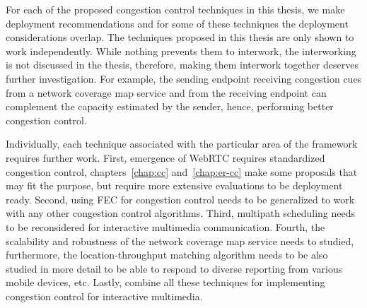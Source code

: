 




For each of the proposed congestion control techniques in this thesis, we make
deployment recommendations and for some of these techniques the deployment
considerations overlap. The techniques proposed in this thesis are only shown
to work independently. While nothing prevents them to interwork, the
interworking is not discussed in the thesis, therefore, making them interwork
together deserves further investigation. For example, the sending endpoint
receiving congestion cues from a network coverage map service and from the
receiving endpoint can complement the capacity estimated by the sender, hence,
performing better congestion control.

Individually, each technique associated with the particular area of the
framework requires further work. First, emergence of WebRTC requires
standardized congestion control, chapters~\ref{chap:cc} and~\ref{chap:er-cc}
make some proposals that may fit the purpose, but require more extensive
evaluations to be deployment ready. Second, using FEC for congestion control
needs to be generalized to work with any other congestion control algorithms.
Third, multipath scheduling needs to be reconsidered for interactive
multimedia communication. Fourth, the scalability and robustness of the
network coverage map service needs to studied, furthermore, the 
location-throughput matching algorithm needs to be also studied in more 
detail to be able to respond to diverse reporting from various mobile 
devices, etc. Lastly, combine all these techniques for implementing 
congestion control for interactive multimedia.


